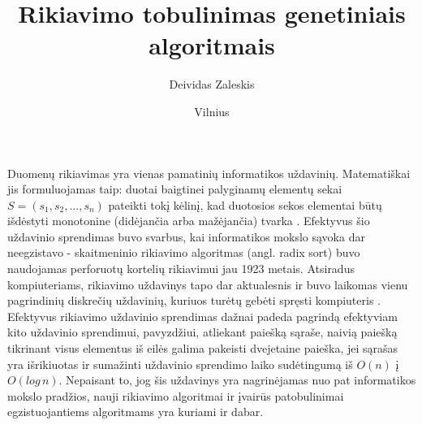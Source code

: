 \documentclass{VUMIFInfKursinis}
\institute{Informatikos institutas}  %
\title{Rikiavimo tobulinimas genetiniais algoritmais}
\author{Deividas Zaleskis}
\date{Vilnius \\ \the\year}
\begin{document}
\maketitle

\tableofcontents



Duomenų rikiavimas yra vienas pamatinių informatikos uždavinių.
Matematiškai jis formuluojamas taip:
duotai baigtinei palyginamų elementų sekai $S = (s_1, s_2, ..., s_n)$ pateikti tokį
kėlinį, kad duotosios sekos elementai būtų išdėstyti monotonine (didėjančia arba mažėjančia) tvarka \cite{Radavičius_Baranauskas_2013}.
Efektyvus šio uždavinio sprendimas buvo svarbus, kai informatikos mokslo sąvoka dar neegzistavo -
skaitmeninio rikiavimo algoritmas (angl. radix sort) buvo naudojamas perforuotų kortelių rikiavimui jau 1923 metais.
Atsiradus kompiuteriams, rikiavimo uždavinys tapo dar aktualesnis ir buvo laikomas vienu pagrindinių diskrečių uždavinių,
kuriuos turėtų gebėti spręsti kompiuteris \cite{10.1145/356580.356581}.
Efektyvus rikiavimo uždavinio sprendimas dažnai padeda pagrindą efektyviam kito uždavinio sprendimui,
pavyzdžiui, atliekant paiešką sąraše, naivią paiešką tikrinant visus elementus iš eilės galima pakeisti dvejetaine paieška, jei sąrašas yra išrikiuotas ir
sumažinti uždavinio sprendimo laiko sudėtingumą iš $O(n)$ į $O(log\,n)$.
Nepaisant to, jog šis uždavinys yra nagrinėjamas nuo pat informatikos mokslo pradžios,
nauji rikiavimo algoritmai ir įvairūs patobulinimai egzistuojantiems algoritmams yra kuriami ir dabar.
\end{document}
